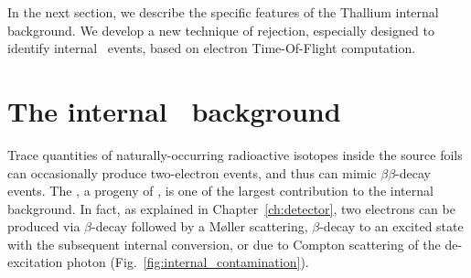 In the next section, we describe the specific features of the Thallium internal background.
We develop a new technique of rejection, especially designed to identify internal \Tl\ events, based on electron Time-Of-Flight computation.

\section{The internal \Tl\ background}

Trace quantities of naturally-occurring radioactive isotopes inside the source foils can occasionally produce two-electron events, and thus can mimic $\beta\beta$-decay events.
The \Tl, a progeny of \Th, is one of the largest contribution to the internal background.
In fact, as explained in Chapter~\ref{ch:detector}, two electrons can be produced via $\beta$-decay followed by a M\o{}ller scattering, $\beta$-decay to an excited state with the subsequent internal conversion, or due to Compton scattering of the de-excitation photon (Fig.~\ref{fig:internal_contamination}).

